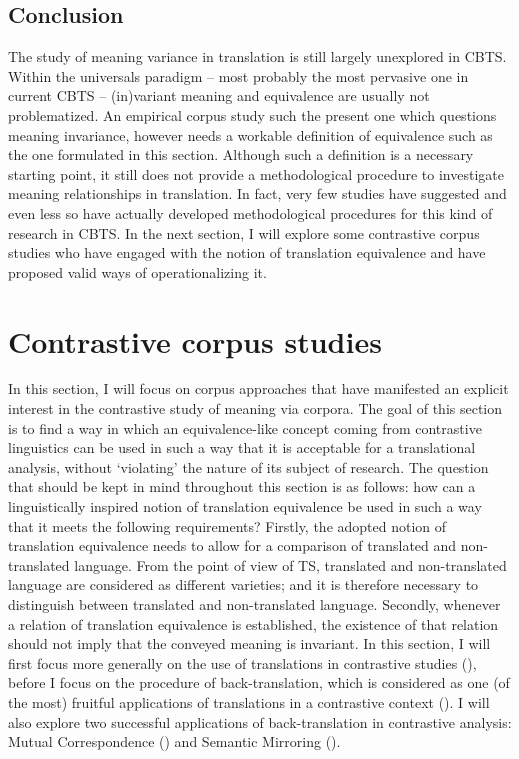 \subsection{Conclusion}
\label{sec:2.2.5}  
The study of meaning variance in translation is still largely unexplored in CBTS. Within the universals paradigm – most probably the most pervasive one in current CBTS – (in)variant meaning and equivalence are usually not problematized. An empirical corpus study such the present one which questions meaning invariance, however needs a workable definition of equivalence such as the one formulated in this section. Although such a definition is a necessary starting point, it still does not provide a methodological procedure to investigate meaning relationships in translation. In fact, very few studies have suggested and even less so have actually developed methodological procedures for this kind of research in CBTS. In the next section, I will explore some contrastive corpus studies who have engaged with the notion of translation equivalence and have proposed valid ways of operationalizing it.

\section{Contrastive corpus studies}
\label{sec:2.3}  
In this section, I will focus on corpus approaches that have manifested an explicit interest in the contrastive study of meaning via corpora. The goal of this section is to find a way in which an equivalence-like concept coming from contrastive linguistics can be used in such a way that it is acceptable for a translational analysis, without ‘violating’ the nature of its subject of research. The question that should be kept in mind throughout this section is as follows: how can a linguistically inspired notion of translation equivalence be used in such a way that it meets the following requirements? Firstly, the adopted notion of translation equivalence needs to allow for a comparison of translated and non-translated language. From the point of view of TS, translated and non-translated language are considered as different varieties; and it is therefore necessary to distinguish between translated and non-translated language. Secondly, whenever a relation of translation equivalence is established, the existence of that relation should not imply that the conveyed meaning is invariant. In this section, I will first focus more generally on the use of translations in contrastive studies (), before I focus on the procedure of back-translation, which is considered as one (of the most) fruitful applications of translations in a contrastive context (). I will also explore two successful applications of back-translation in contrastive analysis: Mutual Correspondence () and Semantic Mirroring ().

